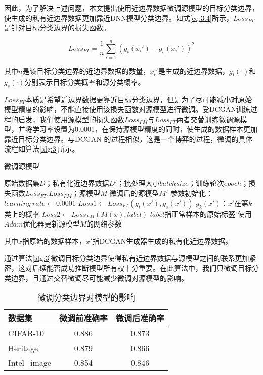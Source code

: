 因此，为了解决上述问题，本文提出使用近边界数据微调源模型的目标分类边界，使生成的私有近边界数据更加靠近DNN模型分类边界。如式\ref{eq:3.4}所示，$Loss_{FT}$是针对目标分类边界的损失函数。

\begin{equation}
	\label{eq:3.9}
	Loss_{FT} = \frac{1}{n} \sum^{n}_{i = 1} (g_t(x_i') - g_s(x_i'))^2
\end{equation}

\noindent 其中$n$是该目标分类边界的近边界数据的数量，$x_i'$是生成的近边界数据，$g_t(\cdot)$和$g_s(\cdot)$分别表示目标分类概率和源分类概率。

$Loss_{FT}$本质是希望近边界数据更靠近目标分类边界，但是为了尽可能减小对原始模型精度的影响，不能直接使用该损失函数对源模型进行微调。受DCGAN训练过程的启发，我们使用源模型的损失函数$Loss_{FM}$与$Loss_{FT}$两者交替训练微调源模型，并将学习率设置为0.0001，在保持源模型精度的同时，使生成的数据样本更加靠近目标分类边界。与DCGAN 的过程相似，这是一个博弈的过程，微调的具体流程如算法\ref{alg:3}所示。

\begin{algorithm}[H] 
	\caption{微调源模型}
	\label{alg:3}
	\begin{algorithmic}[1]
		
		\Require 原始数据集$D$；私有化近边界数据$D'$；批处理大小$batchsize$；训练轮次$epoch$；损失函数$Loss_{FT}$,$Loss_{FM}$；源模型$M$
		\Ensure 微调后的源模型$M'$
		\State 参数初始化：$learning \ rate \gets 0.0001$
		\State $Loss1 \gets Loss_{FT}(g_t(x') , g_s(x'))$ \Comment $g_k(x')$：$x'$在第$k$类上的概率
		\State $Loss2 \gets Loss_{FM}(M(x), label)$ \Comment $label$指正常样本的原始标签
		\State 使用$Adam$优化器更新源模型$M$的网络参数
		\EndFor
	\end{algorithmic}
\end{algorithm}

\noindent 其中$x$指原始的数据样本，$x'$指DCGAN生成器生成的私有化近边界数据。

通过算法\ref{alg:3}微调目标分类边界使得私有近边界数据与源模型之间的联系更加紧密，这对后续能否成功推断模型所有权十分重要。在此算法中，我们只微调目标分类边界，且通过交替微调尽可能减少微调对源模型的影响。

\begin{table}[h]
	\centering
	\renewcommand\arraystretch{1.2}
	\caption{微调分类边界对模型的影响}
	\label{table:state}
	\begin{tabular*}{13cm}{@{\extracolsep{\fill}} l c c}
		
		\hline
		数据集        &    微调前准确率   &   微调后准确率            \\
		\hline
		CIFAR-10      &     0.886        &     0.873               \\
		
		Heritage      &     0.879        &     0.866               \\
		
		Intel\_image  &     0.854        &     0.846               \\
		\hline		
	\end{tabular*}
\end{table}

